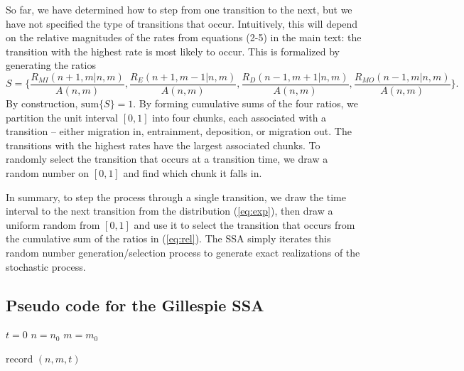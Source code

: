 \documentclass[11pt]{article}
\newcommand\be{\begin{equation}} %
\newcommand\ee{\end{equation}}   %
\begin{document}
So far, we have determined how to step from one transition to the next, but we have not specified the type of transitions that occur.
Intuitively, this will depend on the relative magnitudes of the rates from equations (2-5) in the main text: the transition with the highest rate is most likely to occur. This is formalized by generating the ratios
\be S = \Bigg\{\frac{R_{MI}(n+1,m|n,m)}{ A(n,m)},\frac{R_E(n+1,m-1|n,m)}{ A(n,m)},\frac{R_D(n-1,m+1|n,m)}{ A(n,m)},\frac{R_{MO}(n-1,m|n,m)}{ A(n,m)}\Bigg\}. \label{eq:rel}\ee
By construction, $\text{sum}\{S\}=1$.
By forming cumulative sums of the four ratios, we partition the unit interval $[0,1]$ into four chunks, each associated with a transition -- either migration in, entrainment, deposition, or migration out. The transitions with the highest rates have the largest associated chunks. To randomly select the transition that occurs at a transition time, we draw a random number on $[0,1]$ and find which chunk it falls in.

In summary, to step the process through a single transition, we draw the time interval to the next transition from the distribution (\ref{eq:exp}), then draw a uniform random from $[0,1]$ and use it to select the transition that occurs from the cumulative sum of the ratios in (\ref{eq:rel}). The SSA simply iterates this random number generation/selection process to generate exact realizations of the stochastic process.

\subsection*{Pseudo code for the Gillespie SSA}

\begin{algorithmic}
	\State $t = 0$ 
	\State $n = n_0$
	\State $m =  m_0$

	\State record $(n,m,t)$ 
	\EndWhile
\end{algorithmic}


\end{document}
